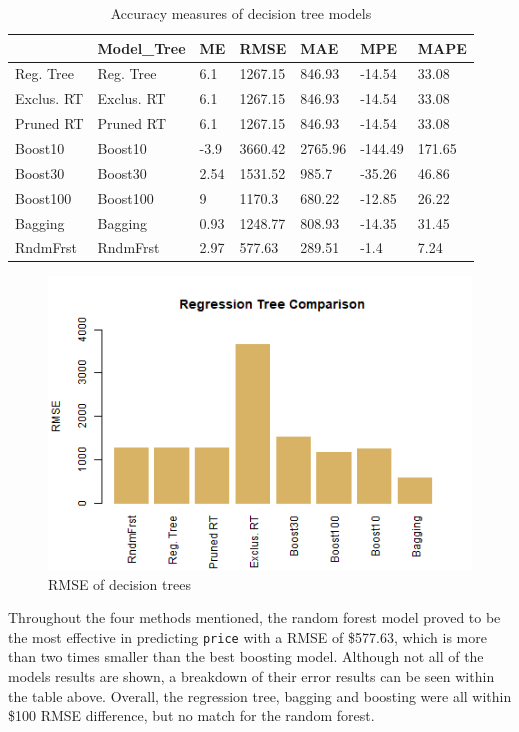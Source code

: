 \documentclass[
  paper=a4,
  ,captions=tableheading
]{scrartcl}
\begin{document}
\begin{table}[!h]

\caption{\label{tab:RegTree Summary}Accuracy measures of decision tree models}
\centering
\begin{tabu} to 
\hline
  & Model\_Tree & ME & RMSE & MAE & MPE & MAPE\\
\hline
Reg. Tree & Reg. Tree & 6.1 & 1267.15 & 846.93 & -14.54 & 33.08\\
\hline
Exclus. RT & Exclus. RT & 6.1 & 1267.15 & 846.93 & -14.54 & 33.08\\
\hline
Pruned RT & Pruned RT & 6.1 & 1267.15 & 846.93 & -14.54 & 33.08\\
\hline
Boost10 & Boost10 & -3.9 & 3660.42 & 2765.96 & -144.49 & 171.65\\
\hline
Boost30 & Boost30 & 2.54 & 1531.52 & 985.7 & -35.26 & 46.86\\
\hline
Boost100 & Boost100 & 9 & 1170.3 & 680.22 & -12.85 & 26.22\\
\hline
Bagging & Bagging & 0.93 & 1248.77 & 808.93 & -14.35 & 31.45\\
\hline
RndmFrst & RndmFrst & 2.97 & 577.63 & 289.51 & -1.4 & 7.24\\
\hline
\end{tabu}
\end{table}

\begin{figure}[H]

{\centering \includegraphics[width=0.5\linewidth,]{Diamonds_PDF_files/figure-latex/RegTree Summary-1} 

}

\caption{RMSE of decision trees}\label{fig:RegTree Summary}
\end{figure}

Throughout the four methods mentioned, the random forest model proved to
be the most effective in predicting \texttt{price} with a RMSE of
\$577.63, which is more than two times smaller than the best boosting
model. Although not all of the models results are shown, a breakdown of
their error results can be seen within the table above. Overall, the
regression tree, bagging and boosting were all within \$100 RMSE
difference, but no match for the random forest.
\end{document}

